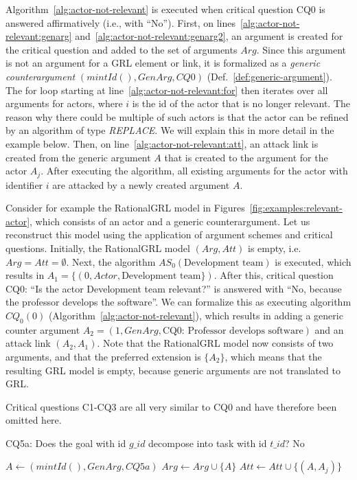 Algorithm~\ref{alg:actor-not-relevant} is executed when critical question CQ0 is answered affirmatively (i.e., with ``No''). First, on lines~\ref{alg:actor-not-relevant:genarg} and~\ref{alg:actor-not-relevant:genarg2}, an argument is created for the critical question and added to the set of arguments $Arg$. Since this argument is not an argument for a GRL element or link, it is formalized as a \emph{generic counterargument} $(mintId(), GenArg, CQ0)$ (Def.~\ref{def:generic-argument}). The for loop starting at line~\ref{alg:actor-not-relevant:for} then iterates over all arguments for actors, where $i$ is the id of the actor that is no longer relevant. The reason why there could be multiple of such actors is that the actor can be refined by an algorithm of type \emph{REPLACE}. We will explain this in more detail in the example below. Then, on line~\ref{alg:actor-not-relevant:att}, an attack link is created from the generic argument $A$ that is created to the argument for the actor $A_j$. After executing the algorithm, all existing arguments for the actor with identifier $i$ are attacked by a newly created argument $A$.

Consider for example the RationalGRL model in Figures~\ref{fig:examples:relevant-actor}, which consists of an actor and a generic counterargument. Let us reconstruct this model using the application of argument schemes and critical questions. Initially, the RationalGRL model $(Arg,Att)$ is empty, i.e. $Arg=Att=\emptyset$. Next, the algorithm $AS_0(\text{Development team})$ is executed, which results in $A_1=\{(0,Actor,\text{Development team}\})$. After this, critical question CQ0: ``Is the actor Development team relevant?'' is answered with ``No, because the professor develops the software''. We can formalize this as executing algorithm $CQ_0(0)$ (Algorithm~\ref{alg:actor-not-relevant}), which results in adding a generic counter argument $A_2=(1, GenArg, \text{CQ0: Professor develops software})$ and an attack link $(A_2,A_1)$. Note that the RationalGRL model now consists of two arguments, and that the preferred extension is $\{A_2\}$, which means that the resulting GRL model is empty, because generic arguments are not translated to GRL.

Critical questions C1-CQ3 are all very similar to CQ0 and have therefore been omitted here.

\begin{algorithm}[h]
  \caption{CQ5a: Does the goal with id $g\_id$ decompose into task with id $t\_id$? No}\label{alg:no-decomp}
  \begin{algorithmic}[1]
    \State $A \leftarrow (mintId(),GenArg,CQ5a)$\label{alg:no-decomp:genarg}
    \State $Arg\leftarrow Arg \cup \{A\}$\label{alg:no-decomp:genarg2}
    \label{alg:no-decomp:for}
      \State $Att \leftarrow Att \cup \{(A,A_j)\}$\label{alg:no-decomp:att}
    \EndFor
    \EndProcedure
  \end{algorithmic}
\end{algorithm}

